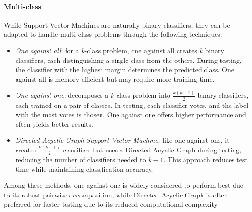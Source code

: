 \paragraph*{Multi-class}
While Support Vector Machines are naturally binary classifiers, they can be adapted to handle multi-class problems through the following techniques:
\begin{itemize}
    \item \textit{One against all}: for a $k$-class problem, one against all creates $k$ binary classifiers, each distinguishing a single class from the others.
        During testing, the classifier with the highest margin determines the predicted class.
        One against all is memory-efficient but may require more training time.
    \item \textit{One against one}: decomposes a $k$-class problem into  $\frac{k(k-1)}{2}$ binary classifiers, each trained on a pair of classes. 
        In testing, each classifier votes, and the label with the most votes is chosen. 
        One against one offers higher performance and often yields better results.
    \item \textit{Directed Acyclic Graph Support Vector Machine}: like one against one, it creates $\frac{k(k-1)}{2}$ classifiers but uses a Directed Acyclic Graph during testing, reducing the number of classifiers needed to $k-1$. 
        This approach reduces test time while maintaining classification accuracy.
\end{itemize}
Among these methods, one against one is widely considered to perform best due to its robust pairwise decomposition, while Directed Acyclic Graph is often preferred for faster testing due to its reduced computational complexity.